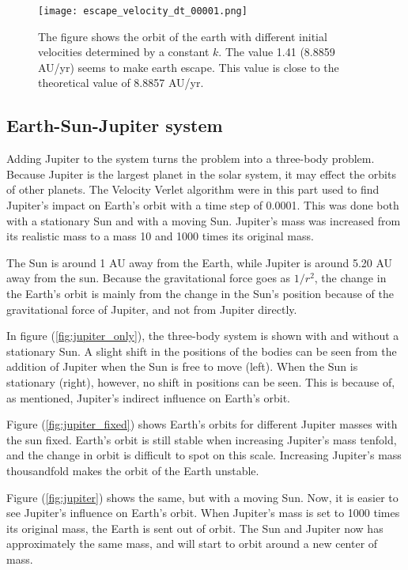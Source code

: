 \documentclass[10pt,a4paper,titlepage]{article}
\begin{document}
\begin{figure}[]
\centering
\centering\texttt{[image: escape\_velocity\_dt\_00001.png]}
\caption{The figure shows the orbit of the earth with different initial velocities determined by a constant $k$. The value 1.41 (8.8859 AU/yr) seems to make earth escape. This value is close to the theoretical value of 8.8857 AU/yr. \label{fig:escape}}
\end{figure}


\subsection{Earth-Sun-Jupiter system}
Adding Jupiter to the system turns the problem into a three-body problem. Because Jupiter is the largest planet in the solar system, it may effect the orbits of other planets. The Velocity Verlet algorithm were in this part used to find Jupiter's impact on Earth's orbit with a time step of 0.0001. This was done both with a stationary Sun and with a moving Sun. Jupiter's mass was increased from its realistic mass to a mass 10 and 1000 times its original mass. 

The Sun is around 1 AU away from the Earth, while Jupiter is around 5.20 AU away from the sun. Because the gravitational force goes as $1/r^2$, the change in the Earth's orbit is mainly from the change in the Sun's position because of the gravitational force of Jupiter, and not from Jupiter directly. 

In figure (\ref{fig:jupiter_only}), the three-body system is shown with and without a stationary Sun. A slight shift in the positions of the bodies can be seen from the addition of Jupiter when the Sun is free to move (left). When the Sun is stationary (right), however, no shift in positions can be seen. This is because of, as mentioned, Jupiter's indirect influence on Earth's orbit.

Figure (\ref{fig:jupiter_fixed}) shows Earth's orbits for different Jupiter masses with the sun fixed. Earth's orbit is still stable when increasing Jupiter's mass tenfold, and the change in orbit is difficult to spot on this scale. Increasing Jupiter's mass thousandfold makes the orbit of the Earth unstable. 

Figure (\ref{fig:jupiter}) shows the same, but with a moving Sun. Now, it is easier to see Jupiter's influence on Earth's orbit. When Jupiter's mass is set to 1000 times its original mass, the Earth is sent out of orbit. The Sun and Jupiter now has approximately the same mass, and will start to orbit around a new center of mass. 
\end{document}
